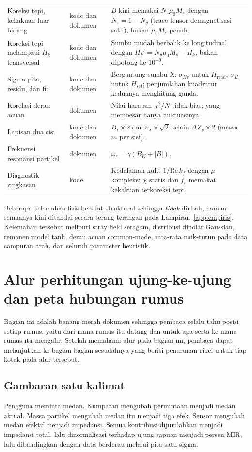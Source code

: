 \documentclass[a4paper,11pt]{article}
\begin{document}
\begin{center}
\begin{tabular}{p{}p{}p{}}
Koreksi tepi, kekakuan luar bidang & kode dan dokumen & $B$ kini memakai
$N_{z}\mu_{0}M_{s}$ dengan $N_{z}=1-N_{y}$ (trace tensor demagnetisasi satu),
bukan $\mu_{0}M_{s}$ penuh.\\
Koreksi tepi melampaui $H_{k}$ transversal & kode dan dokumen & Sumbu mudah
berbalik ke longitudinal dengan $H_{k}'=N_{y}\mu_{0}M_{s}-H_{k}$, bukan dipotong
ke $10^{-9}$.\\
Sigma pita, residu, dan fit & kode dan dokumen & Bergantung sumbu X:
$\sigma_{Hr}$ untuk $H_{\mathrm{read}}$, $\sigma_{H}$ untuk $H_{\mathrm{set}}$;
penjumlahan kuadratur keduanya menghitung ganda.\\
Korelasi derau acuan & dokumen & Nilai harapan $\chi^{2}/N$ tidak bias; yang
membesar hanya fluktuasinya.\\
Lapisan dua sisi & kode dan dokumen & $B_{s}\times2$ dan $\sigma_{s}\times\sqrt{2}$
selain $\Delta Z_{p}\times2$ (massa $m$ per sisi).\\
Frekuensi resonansi partikel & dokumen & $\omega_{r}=\gamma(B_{K}+|B|)$.\\
Diagnostik ringkasan & kode & Kedalaman kulit $1/\mathrm{Re}\,k_{f}$ dengan $\mu$
kompleks; $\chi$ statis dan $f_{r}$ memakai kekakuan terkoreksi tepi.\\
\bottomrule
\end{tabular}
\end{center}
Beberapa kelemahan fisis bersifat struktural sehingga \emph{tidak} diubah,
namun semuanya kini ditandai secara terang-terangan pada
Lampiran~\ref{app:empiris}. Kelemahan tersebut meliputi stray field seragam,
distribusi dipolar Gaussian, remanen model tanh, derau acuan common-mode,
rata-rata naik-turun pada data campuran arah, dan seluruh parameter
heuristik.

\section{Alur perhitungan ujung-ke-ujung dan peta hubungan rumus}
Bagian ini adalah benang merah dokumen sehingga pembaca selalu tahu
posisi setiap rumus, yaitu dari mana rumus itu datang dan untuk apa serta
ke mana rumus itu mengalir. Setelah memahami alur pada bagian ini, pembaca
dapat melanjutkan ke bagian-bagian sesudahnya yang berisi penurunan rinci
untuk tiap kotak pada alur tersebut.

\subsection{Gambaran satu kalimat}
Pengguna meminta medan.
Kumparan mengubah permintaan menjadi medan aktual.
Massa partikel mengubah medan itu menjadi tiga efek.
Sensor mengubah medan efektif menjadi impedansi.
Semua kontribusi dijumlahkan menjadi impedansi total,
lalu dinormalisasi terhadap ujung sapuan menjadi persen MIR,
lalu dibandingkan dengan data berderau melalui pita satu sigma.
\end{document}
